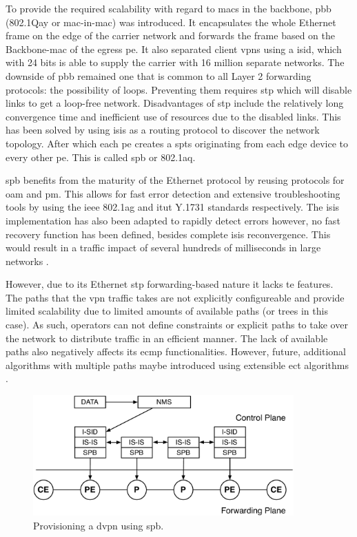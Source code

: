 To provide the required scalability with regard to \acp{mac} in the backbone, \ac{pbb} (802.1Qay or \ac{mac}-in-\ac{mac}) was introduced. It encapsulates the whole Ethernet frame on the edge of the carrier network and forwards the frame based on the Backbone-\ac{mac} of the egress \ac{pe}. It also separated client \acp{vpn} using a \ac{isid}, which with 24 bits is able to supply the carrier with 16 million separate networks. The downside of \ac{pbb} remained one that is common to all Layer 2 forwarding protocols: the possibility of loops. Preventing them requires \ac{stp} which will disable links to get a loop-free network. Disadvantages of \ac{stp} include the relatively long convergence time and inefficient use of resources due to the disabled links. This has been solved by using \acs{isis} as a routing protocol to discover the network topology. After which each \ac{pe} creates a \acp{spt} originating from each edge device to every other \ac{pe}. This is called \ac{spb} or 802.1aq.

\ac{spb} benefits from the maturity of the Ethernet protocol by reusing protocols for \ac{oam} and \ac{pm}. This allows for fast error detection and extensive troubleshooting tools by using the \ac{ieee} 802.1ag and \ac{itut} Y.1731 standards respectively. The \ac{isis} implementation has also been adapted to rapidly detect errors however, no fast recovery function has been defined, besides complete \ac{isis} reconvergence. This would result in a traffic impact of several hundreds of milliseconds in large networks \cite{spb-nanog}. 

However, due to its Ethernet \acs{stp} forwarding-based nature it lacks \ac{te} features. The paths that the \ac{vpn} traffic takes are not explicitly configureable and provide limited scalability due to limited amounts of available paths (or trees in this case). As such, operators can not define constraints or explicit paths to take over the network to distribute traffic in an efficient manner. The lack of available paths also negatively affects its \ac{ecmp} functionalities. However, future, additional algorithms with multiple paths maybe introduced using extensible \ac{ect} algorithms \cite{rfc6329}.

\begin{figure}[!h]
	\centering
	\includegraphics[width=10cm]{./includes/spb-stack.pdf}
	\caption{Provisioning a \ac{dvpn} using \ac{spb}.}
	\label{fig:spb-stack}
\end{figure}

